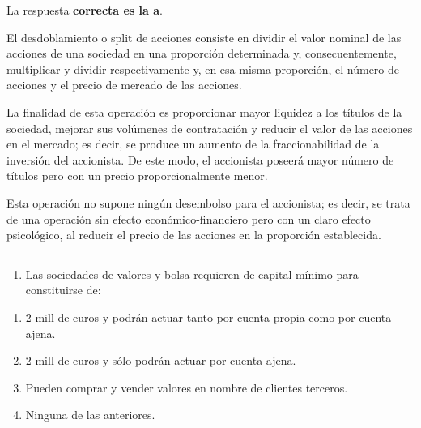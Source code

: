 \documentclass[
  letterpaper,
  DIV=11,
  numbers=noendperiod]{scrreprt}
\providecommand{\tightlist}{%
  \setlength{\itemsep}{0pt}\setlength{\parskip}{0pt}}\usepackage{longtable,booktabs,array}
\begin{document}
\begin{tcolorbox}[enhanced jigsaw, left=2mm, opacityback=0, colback=white, breakable, arc=.35mm, bottomrule=.15mm, rightrule=.15mm, toprule=.15mm, leftrule=.75mm, colframe=quarto-callout-tip-color-frame]
\begin{minipage}[t]{5.5mm}
\textcolor{quarto-callout-tip-color}{\faLightbulb}
\end{minipage}%
\begin{minipage}[t]{\textwidth - 5.5mm}

La respuesta \textbf{correcta es la a}.

El desdoblamiento o split de acciones consiste en dividir el valor
nominal de las acciones de una sociedad en una proporción determinada y,
consecuentemente, multiplicar y dividir respectivamente y, en esa misma
proporción, el número de acciones y el precio de mercado de las
acciones.

La finalidad de esta operación es proporcionar mayor liquidez a los
títulos de la sociedad, mejorar sus volúmenes de contratación y reducir
el valor de las acciones en el mercado; es decir, se produce un aumento
de la fraccionabilidad de la inversión del accionista. De este modo, el
accionista poseerá mayor número de títulos pero con un precio
proporcionalmente menor.

Esta operación no supone ningún desembolso para el accionista; es decir,
se trata de una operación sin efecto económico-financiero pero con un
claro efecto psicológico, al reducir el precio de las acciones en la
proporción establecida.

\end{minipage}%
\end{tcolorbox}

\begin{center}\rule{0.5\linewidth}{0.5pt}\end{center}

\begin{enumerate}
\def\labelenumi{\arabic{enumi}.}
\setcounter{enumi}{23}
\tightlist
\item
  Las sociedades de valores y bolsa requieren de capital mínimo para
  constituirse de:
\end{enumerate}

\begin{enumerate}
\def\labelenumi{\alph{enumi})}
\item
  2 mill de euros y podrán actuar tanto por cuenta propia como por
  cuenta ajena.
\item
  2 mill de euros y sólo podrán actuar por cuenta ajena.
\item
  Pueden comprar y vender valores en nombre de clientes terceros.
\item
  Ninguna de las anteriores.
\end{enumerate}
\end{document}
